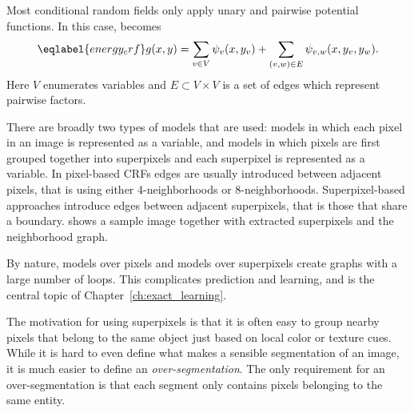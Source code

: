 Most conditional random fields only apply unary and pairwise potential
functions. In this case,  becomes
\begin{equation}\eqlabel{energy_crf}
    g(x, y) = \sum_{v \in V} \psi_v(x, y_v) + \sum_{(v, w) \in E} \psi_{v,w}(x, y_{v}, y_{w}).
\end{equation}
Here $V$ enumerates variables and $E\subset V \times V$ is a set of edges which
represent pairwise factors.

There are broadly two types of models that are used: models in which each pixel
in an image is represented as a variable, and models in which pixels are first
grouped together into superpixels and each superpixel is represented as a
variable.  In pixel-based CRFs edges are usually introduced between adjacent
pixels, that is using either 4-neighborhoods or 8-neighborhoods.
Superpixel-based approaches introduce edges between adjacent superpixels, that
is those that share a boundary.  shows a
sample image together with extracted superpixels and the neighborhood graph.

By nature, models over pixels and models over superpixels create graphs with a
large number of loops. This complicates prediction and learning, and is the
central topic of Chapter~\ref{ch:exact_learning}.

The motivation for using superpixels is that it is often easy to group nearby
pixels that belong to the same object just based on local color or texture cues.
While it is hard to even define what makes a sensible segmentation of an image,
it is much easier to define an \emph{over-segmentation}.
The only requirement for an over-segmentation is that each segment only
contains pixels belonging to the same entity.

